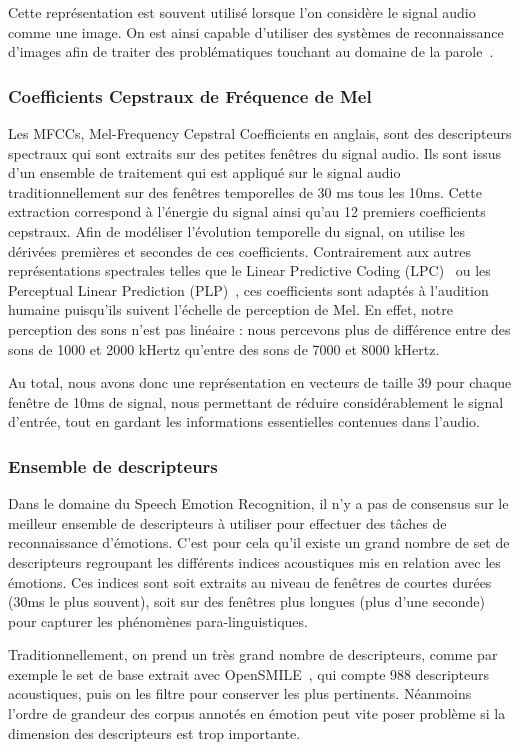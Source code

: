 Cette représentation est souvent utilisé lorsque l'on considère le signal audio comme une image. On est ainsi capable d'utiliser des systèmes de reconnaissance d'images afin de traiter des problématiques touchant au domaine de la parole~\cite{Stolar2017}.


\subsubsection{Coefficients Cepstraux de Fréquence de Mel}
Les MFCCs, Mel-Frequency Cepstral Coefficients en anglais, sont des descripteurs spectraux qui sont extraits sur des petites fenêtres du signal audio. Ils sont issus d'un ensemble de traitement qui est appliqué sur le signal audio traditionnellement sur des fenêtres temporelles de 30 ms tous les 10ms. Cette extraction correspond à l'énergie du signal ainsi qu'au 12 premiers coefficients cepstraux. Afin de modéliser l'évolution temporelle du signal, on utilise les dérivées premières et secondes de ces coefficients. Contrairement aux autres représentations spectrales telles que le Linear Predictive Coding (LPC)~\cite{Rabiner1993} ou les Perceptual Linear Prediction (PLP)~\cite{Hermansky1990}, ces coefficients sont adaptés à l'audition humaine puisqu'ils suivent l'échelle de perception de Mel. En effet, notre perception des sons n'est pas linéaire : nous percevons plus de différence entre des sons de 1000 et 2000 kHertz qu'entre des sons de 7000 et 8000 kHertz.

Au total, nous avons donc une représentation en vecteurs de taille 39 pour chaque fenêtre de 10ms de signal, nous permettant de réduire considérablement le signal d'entrée, tout en gardant les informations essentielles contenues dans l'audio.

\subsubsection{Ensemble de descripteurs}
Dans le domaine du Speech Emotion Recognition, il n’y a pas de consensus sur le meilleur ensemble de descripteurs à utiliser pour effectuer des tâches de reconnaissance d'émotions. C'est pour cela qu'il existe un grand nombre de set de descripteurs regroupant les différents indices acoustiques mis en relation avec les émotions. Ces indices sont soit extraits au niveau de fenêtres de courtes durées (30ms le plus souvent), soit sur des fenêtres plus longues (plus d'une seconde) pour capturer les phénomènes para-linguistiques.

Traditionnellement, on prend un très grand nombre de descripteurs, comme par exemple le set de base extrait avec OpenSMILE~\cite{OPENSMILE}, qui compte 988 descripteurs acoustiques, puis on les filtre pour conserver les plus pertinents. Néanmoins l'ordre de grandeur des corpus annotés en émotion peut vite poser problème si la dimension des descripteurs est trop importante.

